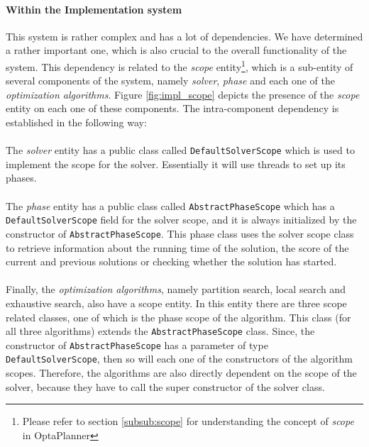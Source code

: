 \paragraph{Within the Implementation system}
This system is rather complex and has a lot of dependencies. We have determined a rather important one, which is also crucial to the overall functionality of the system. This dependency is related to the \textit{scope} entity\footnote{Please refer to section \ref{subsub:scope} for understanding the concept of \textit{scope} in OptaPlanner}, which is a sub-entity of several components of the system, namely \textit{solver}, \textit{phase} and each one of the \textit{optimization algorithms}. 
Figure \ref{fig:impl_scope} depicts the presence of the \textit{scope} entity on each one of these components.
The intra-component dependency is established in the following way:\\\\
The \textit{solver} entity has a public class called \verb!DefaultSolverScope! which is used to implement the scope for the solver. Essentially it will use threads to set up its phases.\\\\
The \textit{phase} entity has a public class called \verb!AbstractPhaseScope! which has a \verb!DefaultSolverScope! field for the solver scope, and it is always initialized by the constructor of \verb!AbstractPhaseScope!.
This phase class uses the solver scope class to retrieve information about the running time of the solution, the score of the current and previous solutions or checking whether the solution has started. \\\\
Finally, the \textit{optimization algorithms}, namely partition search, local search and exhaustive search, also have a scope entity. In this entity there are three scope related classes, one of which is the phase scope of the algorithm. This class (for all three algorithms) extends the \verb!AbstractPhaseScope! class. Since, the constructor of \verb!AbstractPhaseScope! has a parameter of type \verb!DefaultSolverScope!, then so will each one of the constructors of the algorithm scopes. 
Therefore, the algorithms are also directly dependent on the scope of the solver, because they have to call the super constructor of the solver class.
